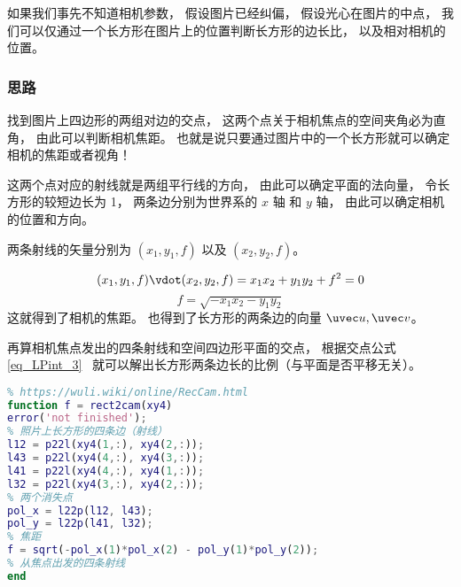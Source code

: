 
\begin{issues}
\issueDraft
\end{issues}


如果我们事先不知道相机参数， 假设图片已经纠偏， 假设光心在图片的中点， 我们可以仅通过一个长方形在图片上的位置判断长方形的边长比， 以及相对相机的位置。

\subsubsection{思路}

找到图片上四边形的两组对边的交点， 这两个点关于相机焦点的空间夹角必为直角， 由此可以判断相机焦距。 也就是说只要通过图片中的一个长方形就可以确定相机的焦距或者视角！

这两个点对应的射线就是两组平行线的方向， 由此可以确定平面的法向量， 令长方形的较短边长为 1， 两条边分别为世界系的 $x$ 轴 和 $y$ 轴， 由此可以确定相机的位置和方向。

两条射线的矢量分别为 $(x_1, y_1, f)$ 以及 $(x_2, y_2, f)$。

\begin{equation}
(x_1, y_1, f)\vdot (x_2, y_2, f) = x_1 x_2 + y_1 y_2 + f^2 = 0
\end{equation}
\begin{equation}
f = \sqrt{-x_1 x_2 - y_1 y_2}
\end{equation}
这就得到了相机的焦距。 也得到了长方形的两条边的向量 $\uvec u, \uvec v$。

再算相机焦点发出的四条射线和空间四边形平面的交点， 根据交点公式\autoref{eq_LPint_3}~ 就可以解出长方形两条边长的比例（与平面是否平移无关）。

\begin{lstlisting}[language=matlab,caption=rect2cam]
% 长方形相机定位法
% https://wuli.wiki/online/RecCam.html
function f = rect2cam(xy4)
error('not finished');
% 照片上长方形的四条边（射线）
l12 = p22l(xy4(1,:), xy4(2,:));
l43 = p22l(xy4(4,:), xy4(3,:));
l41 = p22l(xy4(4,:), xy4(1,:));
l32 = p22l(xy4(3,:), xy4(2,:));
% 两个消失点
pol_x = l22p(l12, l43);
pol_y = l22p(l41, l32);
% 焦距
f = sqrt(-pol_x(1)*pol_x(2) - pol_y(1)*pol_y(2));
% 从焦点出发的四条射线
end
\end{lstlisting}
